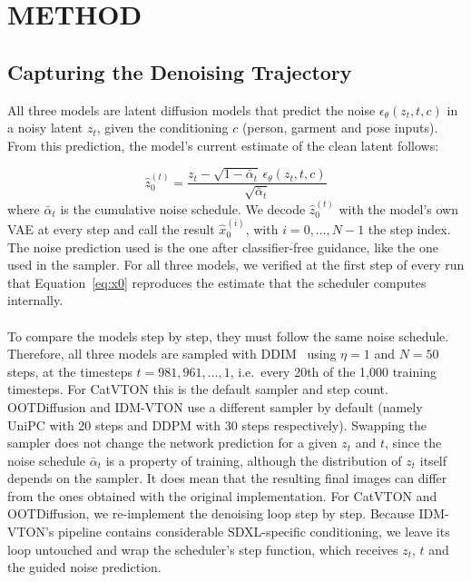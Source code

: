 \section{\uppercase{Method}}
\label{sec:method}

\subsection{Capturing the Denoising Trajectory}
All three models are latent diffusion models that predict the noise $\epsilon_\theta(z_t, t, c)$ in a noisy latent $z_t$, given the conditioning $c$ (person, garment and pose inputs). From this prediction, the model's current estimate of the clean latent follows:

\begin{equation}
\hat{z}_0^{(t)} = \frac{z_t - \sqrt{1-\bar{\alpha}_t}\,\epsilon_\theta(z_t, t, c)}{\sqrt{\bar{\alpha}_t}}
\label{eq:x0}
\end{equation}
where $\bar{\alpha}_t$ is the cumulative noise schedule. We decode $\hat{z}_0^{(t)}$ with the model's own VAE at every step and call the result $\hat{x}_0^{(i)}$, with $i = 0, \dots, N-1$ the step index. The noise prediction used is the one after classifier-free guidance, like the one used in the sampler. For all three models, we verified at the first step of every run that Equation~\ref{eq:x0} reproduces the estimate that the scheduler computes internally.
\\ \\
To compare the models step by step, they must follow the same noise schedule. Therefore, all three models are sampled with DDIM~\cite{song2021ddim} using $\eta = 1$ and $N = 50$ steps, at the timesteps $t = 981, 961, \dots, 1$, i.e.\ every 20th of the 1,000 training timesteps. For CatVTON this is the default sampler and step count. OOTDiffusion and IDM-VTON use a different sampler by default (namely UniPC with 20 steps and DDPM with 30 steps respectively). Swapping the sampler does not change the network prediction for a given $z_t$ and $t$, since the noise schedule $\bar{\alpha}_t$ is a property of training, although the distribution of $z_t$ itself depends on the sampler. It does mean that the resulting final images can differ from the ones obtained with the original implementation.
 For CatVTON and OOTDiffusion, we re-implement the denoising loop step by step. Because IDM-VTON's pipeline contains considerable SDXL-specific conditioning, we leave its loop untouched and wrap the scheduler's step function, which receives $z_t$, $t$ and the guided noise prediction.

